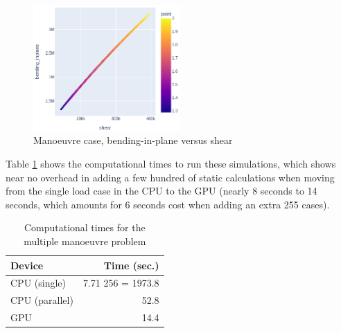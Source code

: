 \documentclass[11pt]{article}
\begin{document}
\begin{figure}[htbp]
\centering
\includegraphics[width=0.5\textwidth]{figs/manoeuvre_bendingshear.png}
\caption{\label{fig:org41f40e0}Manoeuvre case, bending-in-plane versus shear}
\end{figure}

Table \ref{tab:org71806d6} shows the computational times to run these simulations, which shows near no overhead in adding a few hundred of static calculations when moving from the single load case in the CPU to the GPU (nearly 8 seconds to 14 seconds, which amounts for 6 seconds cost when adding an extra 255 cases).

\begin{table}[htbp]
\caption{\label{tab:org71806d6}Computational times for the multiple manoeuvre problem}
\centering
\begin{tabular}{lr}
Device & Time (sec.)\\[0pt]
\hline
CPU (single) & 7.71 \texttimes{} 256 = 1973.8\\[0pt]
CPU (parallel) & 52.8\\[0pt]
GPU & 14.4\\[0pt]
\end{tabular}
\end{table}
\end{document}
